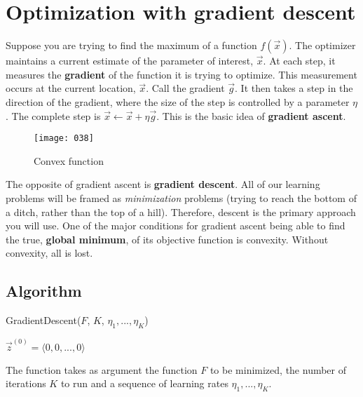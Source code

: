 \section{Optimization with gradient descent}
Suppose you are trying to find the maximum of a function \(f(\vec{x})\). The optimizer maintains a current estimate of the parameter of interest, \(\vec{x}\). At each step, it measures the \textbf{gradient} of the function it is trying to optimize. This measurement occurs at the current location, \(\vec{x}\). Call the gradient \(\vec{g}\). It then takes a step in the direction of the gradient, where the size of the step is controlled by a parameter \(\eta\). The complete step is \(\vec{x} \gets \vec{x} + \eta \vec{g}\). This is the basic idea of \textbf{gradient ascent}.

\begin{wrapfigure}{l}{0.25\textwidth}
\begin{center}
    \texttt{[image: 038]}
    \caption{Convex function}
	\vspace*{-40pt}
\end{center}
\label{fig:038}
\end{wrapfigure}

The opposite of gradient ascent is \textbf{gradient descent}. All of our learning problems will be framed as \emph{minimization} problems (trying to reach the bottom of a ditch, rather than the top of a hill). Therefore, descent is the primary approach you will use. One of the major conditions for gradient ascent being able to find the true, \textbf{global minimum}, of its objective function is convexity. Without convexity, all is lost.

\subsection{Algorithm}
\begin{algorithm}
    \caption{GradientDescent($F$, $K$, $\eta_1, ..., \eta_K$)}
    \label{alg:gradient_descent}
$\vec{z}^{(0)} = \langle 0,0,...,0 \rangle $\;
\end{algorithm}
The function takes as argument the function \(F\) to be minimized, the number of iterations \(K\) to run and a sequence of learning rates \(\eta_1, ..., \eta_K\). 


